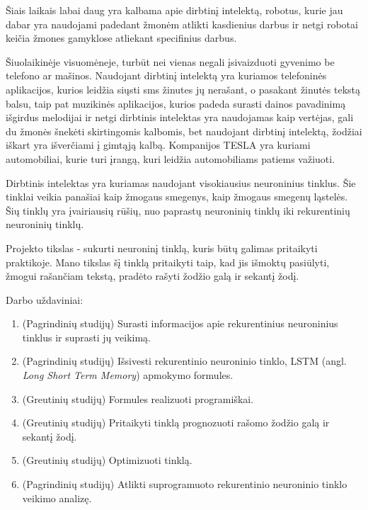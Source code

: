 Šiais laikais labai daug yra kalbama apie dirbtinį intelektą, robotus, kurie jau dabar yra naudojami padedant žmonėm atlikti kasdienius darbus ir netgi robotai keičia žmones gamyklose atliekant specifinius darbus.

Šiuolaikinėje visuomėneje, turbūt nei vienas negali įsivaizduoti gyvenimo be telefono ar mašinos. Naudojant dirbtinį intelektą yra kuriamos telefoninės aplikacijos, kurios leidžia siųsti sms žinutes jų nerašant, o pasakant žinutės tekstą balsu, taip pat muzikinės aplikacijos, kurios padeda surasti dainos pavadinimą išgirdus melodijai ir netgi dirbtinis intelektas yra naudojamas kaip vertėjas, gali du žmonės šnekėti skirtingomis kalbomis, bet naudojant dirbtinį intelektą, žodžiai iškart yra išverčiami į gimtąją kalbą. Kompanijos TESLA yra kuriami automobiliai, kurie turi įrangą, kuri leidžia automobiliams patiems važiuoti.

Dirbtinis intelektas yra kuriamas naudojant visokiausius neuroninius tinklus. Šie tinklai veikia panašiai kaip žmogaus smegenys, kaip žmogaus smegenų ląstelės. Šių tinklų yra įvairiausių rūšių, nuo paprastų neuroninių tinklų iki rekurentinių neuroninių tinklų.

Projekto tikslas - sukurti neuroninį tinklą, kuris būtų galimas pritaikyti praktikoje. Mano tikslas šį tinklą pritaikyti taip, kad jis išmoktų pasiūlyti, žmogui rašančiam tekstą, pradėto rašyti žodžio galą ir sekantį žodį.

Darbo uždaviniai:

\begin{enumerate}
  \item (Pagrindinių studijų) Surasti informacijos apie rekurentinius neuroninius tinklus ir suprasti jų veikimą.
  \item (Pagrindinių studijų) Išsivesti rekurentinio neuroninio tinklo, LSTM (angl. \textit{Long Short Term Memory}) apmokymo formules.
  \item (Greutinių studijų) Formules realizuoti programiškai.
  \item (Greutinių studijų) Pritaikyti tinklą prognozuoti rašomo žodžio galą ir sekantį žodį.
  \item (Greutinių studijų) Optimizuoti tinklą.
  \item (Pagrindinių studijų) Atlikti suprogramuoto rekurentinio neuroninio tinklo veikimo analizę.
\end{enumerate}

\clearpage
